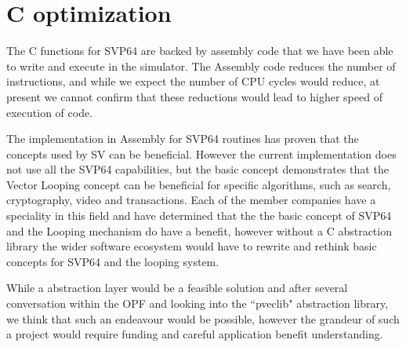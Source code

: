\chapter{C optimization}

The C functions for \acrshort{SVP64} are backed by assembly code that we have been able to write and execute in the simulator.
The Assembly code reduces the number of instructions, and while we expect the number of CPU cycles would reduce,
at present we cannot confirm that these reductions would lead to higher speed of execution of code.

The implementation in Assembly for \acrshort{SVP64} routines has proven that the concepts used by \acrfull{SV} can be beneficial.
However the current implementation does not use all the \acrshort{SVP64} capabilities, but the basic concept demonstrates
that the Vector Looping concept can be beneficial for specific algorithms, such as search, cryptography, video
and transactions.
Each of the member companies have a speciality in this field and have determined that the the basic concept of
\acrshort{SVP64} and the Looping mechanism do have a benefit, however without a C abstraction library the wider software
ecosystem would have to rewrite and rethink basic concepts for \acrshort{SVP64} and the looping system.

While a abstraction layer would be a feasible solution and after several conversation within the \acrshort{OPF}
and looking into the ``pveclib" abstraction library, we think that such an endeavour would be possible,
however the grandeur of such a project would require funding and careful application benefit understanding.
